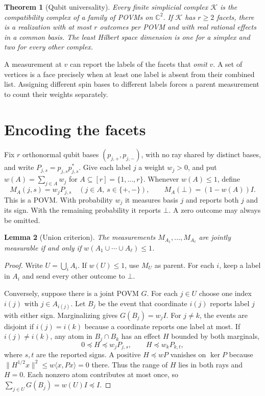 \documentclass[11pt,a4paper]{article}
\newtheorem{theorem}{Theorem}
\newtheorem{lemma}[theorem]{Lemma}
\theoremstyle{definition}
\newcommand{\Id}{I}
\newcommand{\C}{\mathbb C}
\newcommand{\K}{\mathcal K}
\begin{document}
\begin{theorem}[Qubit universality]\label{thm:universal}
Every finite simplicial complex \(\K\) is the compatibility complex of a
family of POVMs on \(\C^2\). If \(\K\) has \(r\ge2\) facets, there is a
realization with at most \(r\) outcomes per POVM and with real rational
effects in a common basis. The least Hilbert space dimension is one
for a simplex and two for every other complex.
\end{theorem}

A measurement at \(v\) can report the labels of the facets that \emph{omit}
\(v\). A set of vertices is a face precisely when at least one label is
absent from their combined list. Assigning different spin bases to different
labels forces a parent measurement to count their weights separately.

\section{Encoding the facets}
Fix \(r\) orthonormal qubit bases \((p_{j,+},p_{j,-})\), with no ray shared
by distinct bases, and write \(P_{j,s}=p_{j,s}p_{j,s}^*\). Give each label
\(j\) a weight \(w_j>0\), and put \(w(A)=\sum_{j\in A}w_j\) for
\(A\subseteq[r]=\{1,\ldots,r\}\). Whenever \(w(A)\le1\), define
\begin{equation}\label{eq:measurement}
 M_A(j,s)=w_jP_{j,s}\quad (j\in A,\ s\in\{+,-\}),\qquad
 M_A(\bot)=(1-w(A))\Id .
\end{equation}
This is a POVM. With probability \(w_j\) it measures basis \(j\) and
reports both \(j\) and its sign. With the remaining probability it reports
\(\bot\). A zero outcome may always be omitted.

\begin{lemma}[Union criterion]\label{lem:union}
The measurements \(M_{A_1},\ldots,M_{A_\ell}\) are jointly measurable if and
only if \(w(A_1\cup\cdots\cup A_\ell)\le1\).
\end{lemma}
\begin{proof}
Write \(U=\bigcup_i A_i\). If \(w(U)\le1\), use \(M_U\) as parent. For
each \(i\), keep a label in \(A_i\) and send every other outcome to \(\bot\).

Conversely, suppose there is a joint POVM \(G\). For each \(j\in U\) choose
one index \(i(j)\) with \(j\in A_{i(j)}\). Let \(B_j\) be the event that
coordinate \(i(j)\) reports label \(j\) with either sign. Marginalizing gives
\(G(B_j)=w_j\Id\). For \(j\ne k\), the events are disjoint if \(i(j)=i(k)\)
because a coordinate reports one label at most. If \(i(j)\ne i(k)\), any
atom in \(B_j\cap B_k\) has an effect \(H\) bounded by both marginals,
\[
          0\preceq H\preceq w_jP_{j,s},\qquad H\preceq w_kP_{k,t},
\]
where \(s,t\) are the reported signs. A positive \(H\preceq wP\) vanishes
on \(\ker P\) because \(\|H^{1/2}x\|^2\le w\langle x,Px\rangle=0\) there.
Thus the range of \(H\) lies in both rays and \(H=0\). Each nonzero atom
contributes at most once, so \(\sum_{j\in U}G(B_j)=w(U)\Id\preceq\Id\).
\end{proof}
\end{document}
